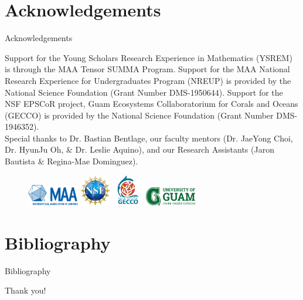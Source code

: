 \documentclass{beamer}
\begin{document}
\section{Acknowledgements}
\begin{frame}{Acknowledgements}
    \begin{center}
        Support for the Young Scholars Research Experience in Mathematics (YSREM)  is through the MAA Tensor SUMMA Program. Support for the MAA National Research Experience for Undergraduates Program (NREUP) is provided by the National Science Foundation (Grant Number DMS-1950644). Support for the NSF EPSCoR project, Guam Ecosystems Collaboratorium for Corals and Oceans (GECCO) is provided by the National Science Foundation (Grant Number DMS-1946352). \\
    \vspace{.2cm}
    \small{Special thanks to Dr. Bastian Bentlage, our faculty mentors (Dr. JaeYong Choi, Dr. HyunJu Oh, \& Dr. Leslie Aquino), and our Research Assistants (Jaron Bautista \& Regina-Mae Dominguez).}
    
    \begin{figure}
        \includegraphics[width = 0.20\textwidth]{Figures/MAA_logo_PMS286.jpg}
        \label{MAA}
        \includegraphics[width = 0.12\textwidth]{Figures/NSF_4-Color_bitmap_Logo.png}
        \label{NSF}
        \includegraphics[width = 0.12\textwidth]{Figures/epscor.jpeg}
        \label{epscor}
        \includegraphics[width = 0.20\textwidth]{Figures/UOG-horizontal.png}
        \label{uog}
    \end{figure}
    \end{center}
\end{frame}




\section{Bibliography}
\begin{frame}[allowframebreaks]{Bibliography}
    \tiny{\printbibliography}
\end{frame}



\begin{frame}
    \Huge{Thank you!}
\end{frame}
\end{document}
